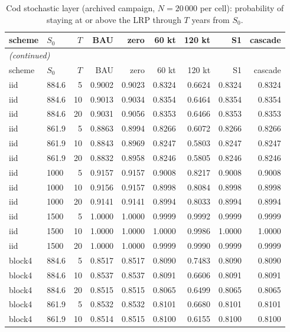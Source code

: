 \begingroup\footnotesize\setlength{\tabcolsep}{3pt}
\begin{longtable}{llrrrrrrr}
\caption{Cod stochastic layer (archived campaign, $N=20\,000$ per cell): probability of staying at or above the LRP through $T$ years from $S_0$.}\label{tab:si-stoch}\\
\toprule
scheme & $S_0$ & $T$ & BAU & zero & 60 kt & 120 kt & S1 & cascade \\
\midrule
\endfirsthead
\multicolumn{9}{l}{\emph{(continued)}}\\
\toprule
scheme & $S_0$ & $T$ & BAU & zero & 60 kt & 120 kt & S1 & cascade \\
\midrule
\endhead
\bottomrule
\endfoot
iid & 884.6 & 5 & 0.9002 & 0.9023 & 0.8324 & 0.6624 & 0.8324 & 0.8324 \\
iid & 884.6 & 10 & 0.9013 & 0.9034 & 0.8354 & 0.6464 & 0.8354 & 0.8354 \\
iid & 884.6 & 20 & 0.9031 & 0.9056 & 0.8353 & 0.6466 & 0.8353 & 0.8353 \\
iid & 861.9 & 5 & 0.8863 & 0.8994 & 0.8266 & 0.6072 & 0.8266 & 0.8266 \\
iid & 861.9 & 10 & 0.8843 & 0.8969 & 0.8247 & 0.5803 & 0.8247 & 0.8247 \\
iid & 861.9 & 20 & 0.8832 & 0.8958 & 0.8246 & 0.5805 & 0.8246 & 0.8246 \\
iid & 1000 & 5 & 0.9157 & 0.9157 & 0.9008 & 0.8217 & 0.9008 & 0.9008 \\
iid & 1000 & 10 & 0.9156 & 0.9157 & 0.8998 & 0.8084 & 0.8998 & 0.8998 \\
iid & 1000 & 20 & 0.9141 & 0.9141 & 0.8994 & 0.8033 & 0.8994 & 0.8994 \\
iid & 1500 & 5 & 1.0000 & 1.0000 & 0.9999 & 0.9992 & 0.9999 & 0.9999 \\
iid & 1500 & 10 & 1.0000 & 1.0000 & 1.0000 & 0.9986 & 1.0000 & 1.0000 \\
iid & 1500 & 20 & 1.0000 & 1.0000 & 0.9999 & 0.9990 & 0.9999 & 0.9999 \\
block4 & 884.6 & 5 & 0.8517 & 0.8517 & 0.8090 & 0.7483 & 0.8090 & 0.8090 \\
block4 & 884.6 & 10 & 0.8537 & 0.8537 & 0.8091 & 0.6606 & 0.8091 & 0.8091 \\
block4 & 884.6 & 20 & 0.8515 & 0.8515 & 0.8065 & 0.6499 & 0.8065 & 0.8065 \\
block4 & 861.9 & 5 & 0.8532 & 0.8532 & 0.8101 & 0.6680 & 0.8101 & 0.8101 \\
block4 & 861.9 & 10 & 0.8514 & 0.8515 & 0.8100 & 0.6155 & 0.8100 & 0.8100 \\

\end{longtable}
